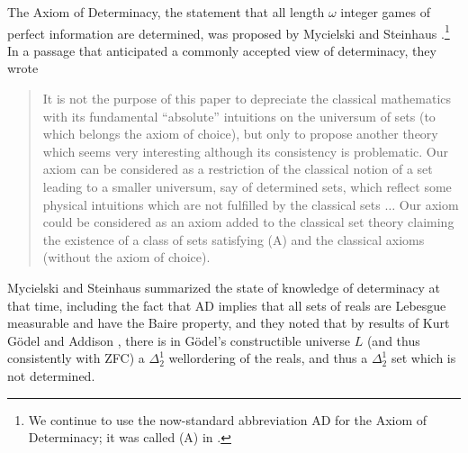 \documentclass{book}%
\begin{document}
The Axiom of Determinacy, the
statement that all length $\omega$ integer games of perfect information are determined, was
proposed by Mycielski and Steinhaus .\footnote{We continue to
use the now-standard abbreviation AD for the Axiom of Determinacy;
it was called (A) in \cite{MycielskiSteinhaus}.} In
a passage that anticipated a commonly accepted view of
determinacy, they wrote
\begin{quote}It is not the purpose of this paper to depreciate the
classical mathematics with its fundamental ``absolute'' intuitions on
the universum of sets (to which belongs the axiom of choice), but
only to propose another theory which seems very interesting although
its consistency is problematic. Our axiom can be considered as a
restriction of the classical notion of a set leading to a smaller
universum, say of determined sets, which reflect some physical
intuitions which are not fulfilled by the classical sets $\ldots$
Our axiom could be considered as an axiom added to the classical set
theory claiming the existence of a class of sets satisfying (A) and
the classical axioms (without the axiom of choice).\end{quote}
Mycielski and Steinhaus summarized the state of knowledge of
determinacy at that time, including the fact that AD implies that all sets of
reals are Lebesgue measurable and have the Baire property,
and they noted that by results of Kurt G\"{o}del and
Addison , there is in G\"{o}del's constructible
universe $L$ (and thus consistently with ZFC) a $\Delta^{1}_{2}$ wellordering of the reals,
and thus a $\Delta^{1}_{2}$ set which is not determined.
\end{document}
